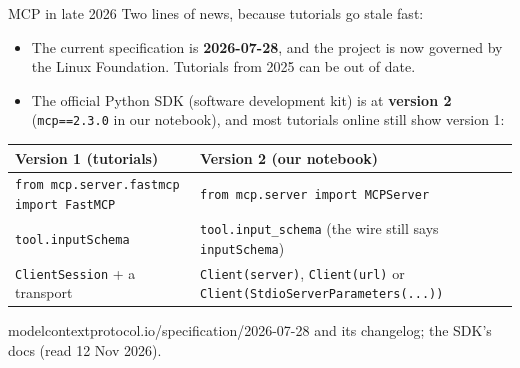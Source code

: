 \documentclass[aspectratio=169]{beamer}
\newcommand{\src}[1]{{\scriptsize\color{gray} #1}}
\begin{document}
\begin{frame}{MCP in late 2026}
  \vspace{0.2em}
  {\small Two lines of news, because tutorials go stale fast:}
  \begin{itemize}
    \item {\small The current specification is \textbf{2026-07-28}, and the project is now governed by the Linux
      Foundation. Tutorials from 2025 can be out of date.}
    \item {\small The official Python SDK (software development kit) is at \textbf{version 2} (\texttt{mcp==2.3.0} in
      our notebook), and
      most tutorials online still show version 1:}
  \end{itemize}

  \vspace{0.1em}
  \begin{center}
  \footnotesize
  \begin{tabular}{>{\raggedright\arraybackslash}p{}>{\raggedright\arraybackslash}p{}}
    \toprule
    \textbf{Version 1 (tutorials)} & \textbf{Version 2 (our notebook)} \\
    \midrule
    \texttt{from mcp.server.fastmcp import FastMCP} & \texttt{from mcp.server import MCPServer} \\
    \texttt{tool.inputSchema} & \texttt{tool.input\_schema} (the wire still says \texttt{inputSchema}) \\
    \texttt{ClientSession} + a transport & \texttt{Client(server)}, \texttt{Client(url)} or
      \texttt{Client(StdioServerParameters(...))} \\
    \bottomrule
  \end{tabular}
  \end{center}

  \vspace{0.2em}
  \src{modelcontextprotocol.io/specification/2026-07-28 and its changelog; the SDK's docs (read 12 Nov 2026).}
\end{frame}
\end{document}
